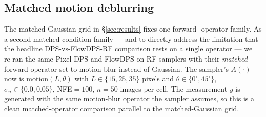 \documentclass{article}
\begin{document}
\subsection{Matched motion deblurring}\label{sec:matched_motion}

The matched-Gaussian grid in \S\ref{sec:results} fixes one forward-
operator family. As a second matched-condition family — and to
directly address the limitation that the headline DPS-vs-FlowDPS-RF
comparison rests on a single operator — we re-ran the same Pixel-DPS
and FlowDPS-on-RF samplers with their \emph{matched} forward
operator set to motion blur instead of Gaussian. The sampler's
$A(\cdot)$ now is $\text{motion}(L, \theta)$ with $L \in \{15, 25, 35\}$
pixels and $\theta \in \{0^\circ, 45^\circ\}$, $\sigma_n \in
\{0.0, 0.05\}$, NFE${=}100$, $n{=}50$ images per cell. The
measurement $y$ is generated with the same motion-blur operator
the sampler assumes, so this is a clean matched-operator comparison
parallel to the matched-Gaussian grid.
\end{document}
